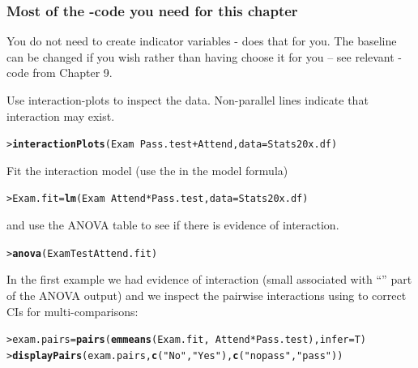 \documentclass{beamer}\usepackage[]{graphicx}\usepackage[]{xcolor}
\makeatletter
\newcommand{\hlstr}[1]{\textcolor[rgb]{0.192,0.494,0.8}{#1}}%
\newcommand{\hlopt}[1]{\textcolor[rgb]{0,0,0}{#1}}%
\newcommand{\hlstd}[1]{\textcolor[rgb]{0.345,0.345,0.345}{#1}}%
\newcommand{\hlkwb}[1]{\textcolor[rgb]{0.69,0.353,0.396}{#1}}%
\newcommand{\hlkwc}[1]{\textcolor[rgb]{0.333,0.667,0.333}{#1}}%
\newcommand{\hlkwd}[1]{\textcolor[rgb]{0.737,0.353,0.396}{\textbf{#1}}}%
\newenvironment{kframe}{%
 \def\at@end@of@kframe{}%
 \ifinner\ifhmode%
  \def\at@end@of@kframe{\end{minipage}}%
  \begin{minipage}{\columnwidth}%
 \fi\fi%
 \def\FrameCommand##1{\hskip\@totalleftmargin \hskip-\fboxsep
 \colorbox{shadecolor}{##1}\hskip-\fboxsep
     \hskip-\linewidth \hskip-\@totalleftmargin \hskip\columnwidth}%
 \MakeFramed {\advance\hsize-\width
   \@totalleftmargin\z@ \linewidth\hsize
   \@setminipage}}%
 {\par\unskip\endMakeFramed%
 \at@end@of@kframe}
\newenvironment{knitrout}{}{} %
\makeatother
\begin{document}
\begin{frame}[fragile]
\frametitle{Most of the -code you need for this chapter}
You do not need to create indicator variables -  does that for you.
The baseline can be changed if you wish rather than having  choose it for you -- see relevant -code from Chapter 9.  
\medskip

Use interaction-plots to inspect the data. Non-parallel lines indicate that interaction may exist.
\begin{knitrout}\scriptsize
{}\color{fgcolor}\begin{kframe}
\begin{alltt}
\hlstd{> }\hlkwd{interactionPlots}\hlstd{(Exam} \hlopt{~} \hlstd{Pass.test} \hlopt{+} \hlstd{Attend,} \hlkwc{data} \hlstd{= Stats20x.df)}
\end{alltt}
\end{kframe}
\end{knitrout}

Fit the interaction model  (use the \rcode{*} in the model formula)
\begin{knitrout}\scriptsize
{}\color{fgcolor}\begin{kframe}
\begin{alltt}
\hlstd{> }\hlstd{Exam.fit} \hlkwb{=} \hlkwd{lm}\hlstd{(Exam} \hlopt{~} \hlstd{Attend}\hlopt{*}\hlstd{Pass.test,} \hlkwc{data} \hlstd{= Stats20x.df)}
\end{alltt}
\end{kframe}
\end{knitrout}
and use the ANOVA table to see if there is evidence of interaction.

\begin{knitrout}\scriptsize
{}\color{fgcolor}\begin{kframe}
\begin{alltt}
\hlstd{> }\hlkwd{anova}\hlstd{(ExamTestAttend.fit)}
\end{alltt}
\end{kframe}
\end{knitrout}
In the first example we had evidence of interaction (small \pval{} associated with ``\rcode{:}'' part of the ANOVA output) and we inspect the pairwise interactions using  to correct CIs for multi-comparisons:

\begin{knitrout}\scriptsize
{}\color{fgcolor}\begin{kframe}
\begin{alltt}
\hlstd{> }\hlstd{exam.pairs} \hlkwb{=} \hlkwd{pairs}\hlstd{(}\hlkwd{emmeans}\hlstd{(Exam.fit,} \hlopt{~} \hlstd{Attend}\hlopt{*}\hlstd{Pass.test),} \hlkwc{infer}\hlstd{=T)}
\hlstd{> }\hlkwd{displayPairs}\hlstd{(exam.pairs,} \hlkwd{c}\hlstd{(}\hlstr{"No"}\hlstd{,}\hlstr{"Yes"}\hlstd{),} \hlkwd{c}\hlstd{(}\hlstr{"nopass"}\hlstd{,}\hlstr{"pass"}\hlstd{))}
\end{alltt}
\end{kframe}
\end{knitrout}


\end{frame}
\end{document}
